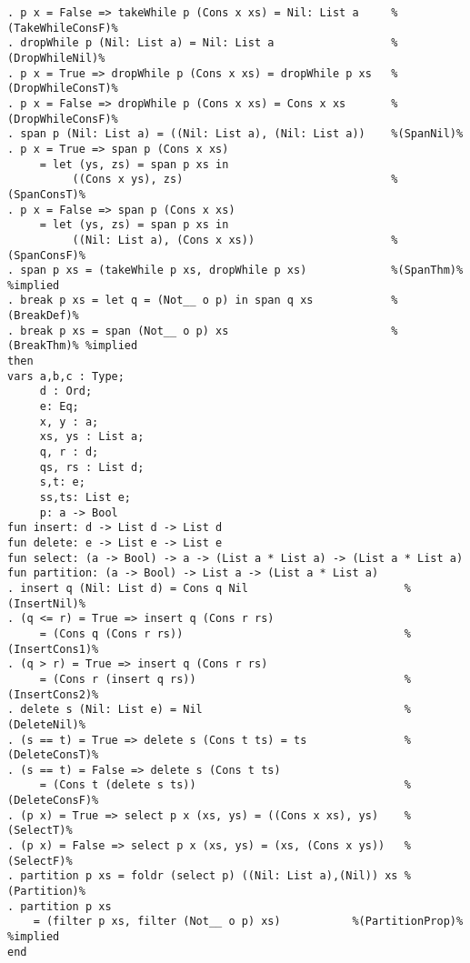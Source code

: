 \begin{Verbatim}
. p x = False => takeWhile p (Cons x xs) = Nil: List a     %(TakeWhileConsF)%
. dropWhile p (Nil: List a) = Nil: List a                  %(DropWhileNil)%
. p x = True => dropWhile p (Cons x xs) = dropWhile p xs   %(DropWhileConsT)%
. p x = False => dropWhile p (Cons x xs) = Cons x xs       %(DropWhileConsF)%
. span p (Nil: List a) = ((Nil: List a), (Nil: List a))    %(SpanNil)%
. p x = True => span p (Cons x xs) 
     = let (ys, zs) = span p xs in
          ((Cons x ys), zs)                                %(SpanConsT)%
. p x = False => span p (Cons x xs)
     = let (ys, zs) = span p xs in
          ((Nil: List a), (Cons x xs))                     %(SpanConsF)%
. span p xs = (takeWhile p xs, dropWhile p xs)             %(SpanThm)% %implied
. break p xs = let q = (Not__ o p) in span q xs            %(BreakDef)%
. break p xs = span (Not__ o p) xs                         %(BreakThm)% %implied
then
vars a,b,c : Type;
     d : Ord;
     e: Eq;
     x, y : a;
     xs, ys : List a;
     q, r : d;
     qs, rs : List d;
     s,t: e;
     ss,ts: List e;
     p: a -> Bool
fun insert: d -> List d -> List d
fun delete: e -> List e -> List e
fun select: (a -> Bool) -> a -> (List a * List a) -> (List a * List a)
fun partition: (a -> Bool) -> List a -> (List a * List a)
. insert q (Nil: List d) = Cons q Nil                        %(InsertNil)%
. (q <= r) = True => insert q (Cons r rs) 
     = (Cons q (Cons r rs))                                  %(InsertCons1)%
. (q > r) = True => insert q (Cons r rs) 
     = (Cons r (insert q rs))                                %(InsertCons2)%
. delete s (Nil: List e) = Nil                               %(DeleteNil)%
. (s == t) = True => delete s (Cons t ts) = ts               %(DeleteConsT)%
. (s == t) = False => delete s (Cons t ts) 
     = (Cons t (delete s ts))                                %(DeleteConsF)%
. (p x) = True => select p x (xs, ys) = ((Cons x xs), ys)    %(SelectT)%
. (p x) = False => select p x (xs, ys) = (xs, (Cons x ys))   %(SelectF)%
. partition p xs = foldr (select p) ((Nil: List a),(Nil)) xs %(Partition)%
. partition p xs 
    = (filter p xs, filter (Not__ o p) xs)           %(PartitionProp)% %implied
end
\end{Verbatim}

